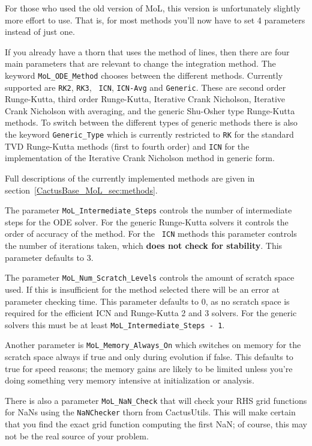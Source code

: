 For those who used the old version of MoL, this version is
unfortunately slightly more effort to use. That is, for most methods
you'll now have to set 4 parameters instead of just one. 

If you already have a thorn that uses the method of lines, then there
are four main parameters that are relevant to change the integration
method. The keyword {\tt MoL\_ODE\_Method} chooses between the
different methods. Currently supported are {\tt RK2}, {\tt RK3}, {\tt
  ICN}, {\tt ICN-Avg} and {\tt Generic}. These are second order
Runge-Kutta, third order Runge-Kutta, Iterative Crank Nicholson,
Iterative Crank Nicholson with averaging, and the generic Shu-Osher
type Runge-Kutta methods. To switch between the different types of
generic methods there is also the keyword {\tt Generic\_Type} which is
currently restricted to {\tt RK} for the standard TVD Runge-Kutta
methods (first to fourth order) and {\tt ICN} for the implementation
of the Iterative Crank Nicholson method in generic form.

Full descriptions of the currently implemented methods are given in
section~\ref{CactusBase_MoL_sec:methods}. 

The parameter {\tt MoL\_Intermediate\_Steps} controls the number of
intermediate steps for the ODE solver. For the generic Runge-Kutta
solvers it controls the order of accuracy of the method.  For the {\tt
  ICN} methods this parameter controls the number of iterations taken,
which {\bf does not check for stability}. This parameter defaults to
3.

The parameter {\tt MoL\_Num\_Scratch\_Levels} controls the amount of
scratch space used. If this is insufficient for the method selected
there will be an error at parameter checking time. This parameter
defaults to 0, as no scratch space is required for the efficient ICN
and Runge-Kutta 2 and 3 solvers. For the generic solvers this must be
at least {\tt MoL\_Intermediate\_Steps - 1}.

Another parameter is {\tt MoL\_Memory\_Always\_On} which switches on
memory for the scratch space always if true and only during evolution
if false. This defaults to true for speed reasons; the memory gains
are likely to be limited unless you're doing something very memory
intensive at initialization or analysis.

There is also a parameter {\tt MoL\_NaN\_Check} that will check your
RHS grid functions for NaNs using the {\tt NaNChecker} thorn from
CactusUtils. This will make certain that you find the exact grid
function computing the first NaN; of course, this may not be the real
source of your problem.

